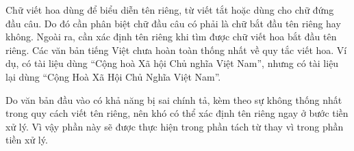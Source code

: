 \documentclass[a4paper,oneside,14pt]{extbook} %
\begin{document}
Chữ viết hoa dùng để biểu diễn tên riêng, từ viết tắt hoặc dùng cho
chữ đứng đầu câu. Do đó cần phân biệt chữ đầu câu có 
phải là chữ bắt đầu tên riêng hay không. Ngoài ra, cần xác định tên riêng khi
tìm được chữ viết hoa bắt đầu tên riêng. Các văn bản tiếng Việt chưa
hoàn toàn thống nhất về quy tắc viết hoa. Ví dụ, có tài liệu dùng
``Cộng hoà Xã hội Chủ nghĩa Việt Nam'', nhưng có tài liệu lại dùng
``Cộng Hoà Xã Hội Chủ Nghĩa Việt Nam''.

Do văn bản đầu vào có khả năng bị sai chính tả, kèm theo sự không
thống nhất trong quy cách viết tên riêng, nên khó có thể xác định
tên riêng ngay ở bước tiền xử lý. Vì vậy phần này sẽ được thực hiện trong
phần tách từ thay vì trong phần tiền xử lý.





\end{document}
